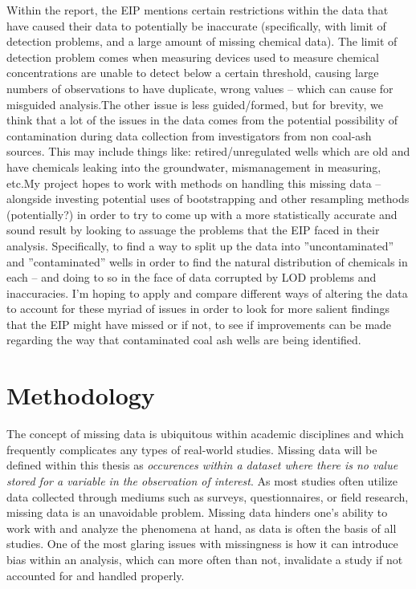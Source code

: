 \documentclass[12pt, twoside]{amherstthesis}
\begin{document}
Within the report, the EIP mentions certain restrictions within the data that have caused their data to potentially be inaccurate (specifically, with limit of detection problems, and a large amount of missing chemical data). The limit of detection problem comes when measuring devices used to measure chemical concentrations are unable to detect below a certain threshold, causing large numbers of observations to have duplicate, wrong values -- which can cause for misguided analysis.The other issue is less guided/formed, but for brevity, we think that a lot of the issues in the data comes from the potential possibility of contamination during data collection from investigators from non coal-ash sources. This may include things like: retired/unregulated wells which are old and have chemicals leaking into the groundwater, mismanagement in measuring, etc.My project hopes to work with methods on handling this missing data -- alongside investing potential uses of bootstrapping and other resampling methods (potentially?) in order to try to come up with a more statistically accurate and sound result by looking to assuage the problems that the EIP faced in their analysis. Specifically, to find a way to split up the data into ''uncontaminated'' and ''contaminated'' wells in order to find the natural distribution of chemicals in each -- and doing to so in the face of data corrupted by LOD problems and inaccuracies. I'm hoping to apply and compare different ways of altering the data to account for these myriad of issues in order to look for more salient findings that the EIP might have missed or if not, to see if improvements can be made regarding the way that contaminated coal ash wells are being identified.

\hypertarget{methodology}{%
\chapter{Methodology}\label{methodology}}

The concept of missing data is ubiquitous within academic disciplines and which frequently complicates any types of real-world studies. Missing data will be defined within this thesis as \emph{occurences within a dataset where there is no value stored for a variable in the observation of interest}. As most studies often utilize data collected through mediums such as surveys, questionnaires, or field research, missing data is an unavoidable problem. Missing data hinders one's ability to work with and analyze the phenomena at hand, as data is often the basis of all studies. One of the most glaring issues with missingness is how it can introduce bias within an analysis, which can more often than not, invalidate a study if not accounted for and handled properly.
\end{document}
